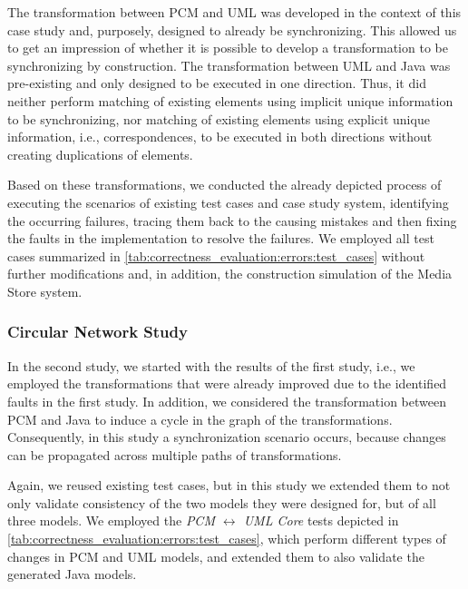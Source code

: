 The transformation between \gls{PCM} and \gls{UML} was developed in the context of this case study and, purposely, designed to already be synchronizing.
This allowed us to get an impression of whether it is possible to develop a transformation to be synchronizing by construction.
The transformation between \gls{UML} and Java was pre-existing and only designed to be executed in one direction.
Thus, it did neither perform matching of existing elements using implicit unique information to be synchronizing, nor matching of existing elements using explicit unique information, i.e., correspondences, to be executed in both directions without creating duplications of elements.

Based on these transformations, we conducted the already depicted process of executing the scenarios of existing test cases and case study system, identifying the occurring failures, tracing them back to the causing mistakes and then fixing the faults in the implementation to resolve the failures.
We employed all test cases summarized in \autoref{tab:correctness_evaluation:errors:test_cases} without further modifications and, in addition, the construction simulation of the Media Store system.

\subsubsection*{Circular Network Study} 

In the second study, we started with the results of the first study, i.e., we employed the transformations that were already improved due to the identified faults in the first study.
In addition, we considered the transformation between \gls{PCM} and Java to induce a cycle in the graph of the transformations.
Consequently, in this study a synchronization scenario occurs, because changes can be propagated across multiple paths of transformations.

Again, we reused existing test cases, but in this study we extended them to not only validate consistency of the two models they were designed for, but of all three models.
We employed the \emph{PCM $\leftrightarrow$ UML Core} tests depicted in \autoref{tab:correctness_evaluation:errors:test_cases}, which perform different types of changes in \gls{PCM} and \gls{UML} models, and extended them to also validate the generated Java models.

